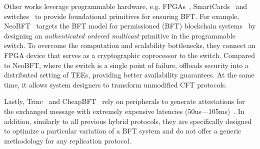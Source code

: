  Other works leverage programmable hardware, e.g. FPGAs~\cite{10.1145/2168836.2168866}, SmartCards~\cite{levin2009trinc} and switches~\cite{10.1145/3603269.3604874} to provide foundational primitives for ensuring BFT. For example, NeoBFT~\cite{10.1145/3603269.3604874} targets the BFT model for permissioned (BFT) blockchain systems~\cite{10.1145/3190508.3190538} by designing an \emph{authenticated ordered multicast} primitive in the programmable switch. To overcome the computation and scalability bottlenecks, they connect an FPGA device that serves as a cryptographic coprocessor to the switch. Compared to NeoBFT, where the switch is a single point of failure, \projecttitle{} offloads security into a distributed setting of TEEs, providing better availability guarantees. At the same time, it allows system designers to transform unmodified CFT protocols.  

Lastly, Trinc~\cite{levin2009trinc} and CheapBFT~\cite{10.1145/2168836.2168866} rely on peripherals to generate attestations for the exchanged message with extremely expensive latencies (50us---105ms)~\cite{levin2009trinc, 10.1145/2168836.2168866}. In addition, similarly to all previous hybrid protocols, they are specifically designed to optimize a particular variation of a BFT system and do not offer a generic methodology for any replication protocol. 

 




